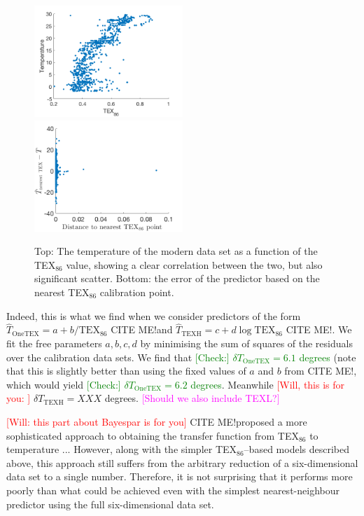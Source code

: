 \documentclass[rmp,aps,twocolumn]{revtex4-1}
\newcommand{\todo}[1]{\textcolor{red}{#1}}
\newcommand{\tocheck}[1]{\textcolor{green}{[Check:] #1}}
\newcommand{\citeme}{{\color{blue} CITE ME!}}
\newcommand{\ilya}[1]{\textcolor{magenta}{#1}}
\begin{document}
\begin{figure}
	\centering
	\includegraphics[width=0.5\textwidth]{TEX86.png}
	\includegraphics[width=0.5\textwidth]{TTEX86.png}
	\caption{\label{fig:TEX86}  Top: The temperature of the modern data set as a function of the TEX$_{86}$ value, showing a clear correlation between the two, but also significant scatter.  Bottom: the error of the predictor based on the nearest TEX$_{86}$ calibration point.}
\end{figure}

Indeed, this is what we find when we consider predictors of the form $\hat{T}_\mathrm{OneTEX}  = a + b / \mathrm{TEX}_{86}$ \citeme and $\hat{T}_\mathrm{TEXH}  = c + d \log \mathrm{TEX}_{86}$ \citeme.  We fit the free parameters $a, b, c, d$ by minimising the sum of squares of the residuals over the calibration data sets.  We find that \tocheck{$\delta T_\mathrm{OneTEX} = 6.1$ degrees} (note that this is slightly better than using the fixed values of $a$ and $b$ from \citeme, which would yield \tocheck{$\delta T_\mathrm{OneTEX} = 6.2$ degrees}.  Meanwhile \todo{[Will, this is for you: ]} $\delta T_\mathrm{TEXH} = XXX$ degrees.  \ilya{[Should we also include TEXL?]}  

\todo{[Will: this part about Bayespar is for you]} \citeme proposed a more sophisticated approach to obtaining the transfer function from TEX$_{86}$ to temperature ...  However, along with the simpler TEX$_{86}$--based models described above, this approach still suffers from the arbitrary reduction of a six-dimensional data set to a single number.  Therefore, it is not surprising that it performs more poorly than what could be achieved even with the simplest nearest-neighbour predictor using the full six-dimensional data set.
\end{document}
